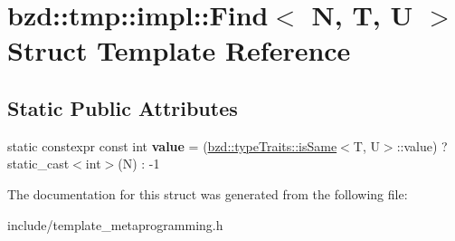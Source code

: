 \hypertarget{structbzd_1_1tmp_1_1impl_1_1Find_3_01N_00_01T_00_01U_01_4}{}\section{bzd\+:\+:tmp\+:\+:impl\+:\+:Find$<$ N, T, U $>$ Struct Template Reference}
\label{structbzd_1_1tmp_1_1impl_1_1Find_3_01N_00_01T_00_01U_01_4}
\subsection*{Static Public Attributes}
\begin{DoxyCompactItemize}
\item 
\mbox{\label{structbzd_1_1tmp_1_1impl_1_1Find_3_01N_00_01T_00_01U_01_4_af52277747aae34ad7ce3dcec4329fb57}} 
static constexpr const int {\bfseries value} = (\hyperlink{structbzd_1_1typeTraits_1_1isSame}{bzd\+::type\+Traits\+::is\+Same}$<$T, U$>$\+::value) ? static\+\_\+cast$<$int$>$(N) \+: -\/1
\end{DoxyCompactItemize}


The documentation for this struct was generated from the following file\+:\begin{DoxyCompactItemize}
\item 
include/template\+\_\+metaprogramming.\+h\end{DoxyCompactItemize}
